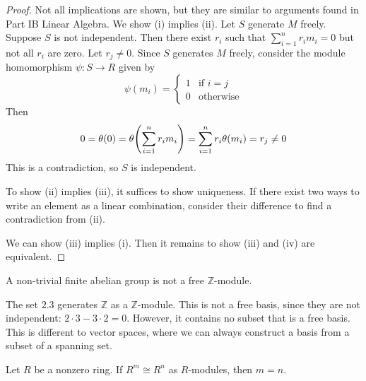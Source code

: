 \begin{proof}
	Not all implications are shown, but they are similar to arguments found in Part IB Linear Algebra.
	We show (i) implies (ii).
	Let \( S \) generate \( M \) freely.
	Suppose \( S \) is not independent.
	Then there exist \( r_i \) such that \( \sum_{i=1}^n r_i m_i = 0 \) but not all \( r_i \) are zero.
	Let \( r_j \neq 0 \).
	Since \( S \) generates \( M \) freely, consider the module homomorphism \( \psi \colon S \to R \) given by
	\[ \psi(m_i) = \begin{cases}
		1 & \text{if } i = j \\
		0 & \text{otherwise}
	\end{cases} \]
	Then
	\[ 0 = \theta(0) = \theta\qty(\sum_{i=1}^n r_i m_i) = \sum_{i=1}^n r_i \theta(m_i) = r_j \neq 0 \]
	This is a contradiction, so \( S \) is independent.

	To show (ii) implies (iii), it suffices to show uniqueness.
	If there exist two ways to write an element as a linear combination, consider their difference to find a contradiction from (ii).

	We can show (iii) implies (i).
	Then it remains to show (iii) and (iv) are equivalent.
\end{proof}
\begin{example}
	A non-trivial finite abelian group is not a free \( \mathbb Z \)-module.

	The set \( \qty{2,3} \) generates \( \mathbb Z \) as a \( \mathbb Z \)-module.
	This is not a free basis, since they are not independent: \( 2 \cdot 3 - 3 \cdot 2 = 0 \).
	However, it contains no subset that is a free basis.
	This is different to vector spaces, where we can always construct a basis from a subset of a spanning set.
\end{example}
\begin{proposition}
	Let \( R \) be a nonzero ring.
	If \( R^m \cong R^n \) as \( R \)-modules, then \( m = n \).
\end{proposition}
